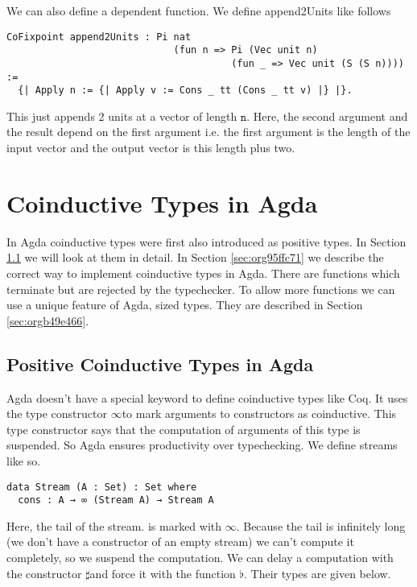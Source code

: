 \documentclass[a4paper,cleardoubleempty,BCOR1cm]{scrbook}
\begin{document}
We can also define a dependent function.  We define append2Units like
follows
\begin{verbatim}
CoFixpoint append2Units : Pi nat
                             (fun n => Pi (Vec unit n)
                                       (fun _ => Vec unit (S (S n)))) :=
  {| Apply n := {| Apply v := Cons _ tt (Cons _ tt v) |} |}.
\end{verbatim}
This just appends 2 units at a vector of length $\mathtt{n}$.  Here, the second
argument and the result depend on the first argument i.e. the first argument
is the length of the input vector and the output vector is this length plus
two.

\section{Coinductive Types in Agda}
\label{sec:org174b8e2}
In Agda coinductive types were first also introduced as positive types. In
Section \ref{sec:orga9a7203} we will look at them in
detail. In Section \ref{sec:org95ffc71} we describe the correct
way to implement coinductive types in Agda. There are functions which
terminate but are rejected by the typechecker. To allow more functions we
can use a unique feature of Agda, sized types. They are described in Section
\ref{sec:orgb49e466}.

\subsection{Positive Coinductive Types in Agda}
\label{sec:orga9a7203}
Agda doesn't have a special keyword to define coinductive types like Coq.  It
uses the type constructor $\mathtt{\infty}$\;to mark arguments to constructors as coinductive.
This type constructor says that the computation of arguments of this type is suspended.
So Agda ensures productivity over typechecking. We define streams like so.

\begin{verbatim}
data Stream (A : Set) : Set where
  cons : A → ∞ (Stream A) → Stream A
\end{verbatim}

Here, the tail of the stream. is marked with $\mathtt{\infty}$. Because the tail is
infinitely long (we don't have a constructor of an empty stream) we can't
compute it completely, so we suspend the computation. We can delay a
computation with the constructor $\mathtt{\sharp}$\;and force it with the function
$\mathtt{\flat}$. Their types are given below.
\end{document}
